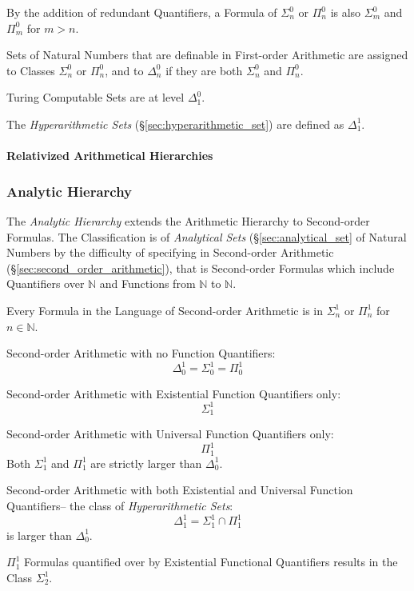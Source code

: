 By the addition of redundant Quantifiers, a Formula of $\Sigma^0_n$ or
$\Pi^0_n$ is also $\Sigma^0_m$ and $\Pi^0_m$ for $m > n$.

Sets of Natural Numbers that are definable in First-order Arithmetic
are assigned to Classes $\Sigma^0_n$ or $\Pi^0_n$, and to $\Delta^0_n$
if they are both $\Sigma^0_n$ and $\Pi^0_n$.

Turing Computable Sets are at level $\Delta^0_1$.

The \emph{Hyperarithmetic Sets} (\S\ref{sec:hyperarithmetic_set})
are defined as $\Delta^1_1$.

\paragraph{Relativized Arithmetical Hierarchies}\hfill



\subsubsection{Analytic Hierarchy}\label{sec:analytic_hierarchy}

The \emph{Analytic Hierarchy} extends the Arithmetic Hierarchy to
Second-order Formulas. The Classification is of \emph{Analytical Sets}
(\S\ref{sec:analytical_set} of Natural Numbers by the difficulty of
specifying in Second-order Arithmetic
(\S\ref{sec:second_order_arithmetic}), that is Second-order Formulas which
include Quantifiers over $\mathbb{N}$ and Functions from $\mathbb{N}$
to $\mathbb{N}$.

Every Formula in the Language of Second-order Arithmetic is in
$\Sigma^1_n$ or $\Pi^1_n$ for $n \in \mathbb{N}$.

Second-order Arithmetic with no Function Quantifiers:
\[
  \Delta^1_0 = \Sigma^1_0 = \Pi^1_0
\]

Second-order Arithmetic with Existential Function Quantifiers only:
\[
  \Sigma^1_1
\]

Second-order Arithmetic with Universal Function Quantifiers only:
\[
  \Pi^1_1
\]
Both $\Sigma^1_1$ and $\Pi^1_1$ are strictly larger than $\Delta^1_0$.

Second-order Arithmetic with both Existential and Universal Function
Quantifiers-- the class of \emph{Hyperarithmetic Sets}:
\[
  \Delta^1_1 = \Sigma^1_1 \cap \Pi^1_1
\]
is larger than $\Delta^1_0$.

$\Pi^1_1$ Formulas quantified over by Existential Functional
Quantifiers results in the Class $\Sigma^1_2$.


